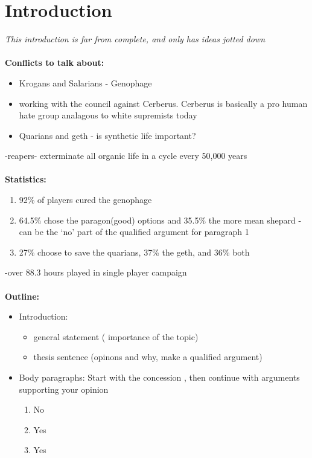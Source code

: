 \documentclass[journal]{IEEEtran}
\begin{document}
\section{Introduction}
\textit{This introduction is far from complete, and only has ideas jotted down}
\\ \\
\textbf{Conflicts to talk about:}
\begin{itemize}
 \item Krogans and Salarians - Genophage
 \item working with the council against Cerberus. Cerberus is basically a pro human hate group analagous to white supremists today
 \item Quarians and geth - is synthetic life important?
\end{itemize}
-reapers- exterminate all organic life in a cycle every 50,000 years
\\ \\
\textbf{Statistics:}
\begin{enumerate}
 \item 92\% of players cured the genophage
 \item 64.5\% chose the paragon(good) options and 35.5\% the more mean shepard - can be the `no' part of the qualified argument for paragraph 1
 \item 27\% choose to save the quarians, 37\% the geth, and 36\% both
\end{enumerate}
-over 88.3 hours played in single player campaign
\\ \\
\textbf{Outline:}
\begin{itemize}
 \item Introduction:
       \begin{itemize}
        \item general statement ( importance of the topic)
        \item thesis sentence (opinons and why, make a qualified argument)
       \end{itemize}
 \item Body paragraphs: Start with the concession , then continue with arguments supporting your opinion
       \begin{enumerate}
        \item No
        \item Yes
        \item Yes
       \end{enumerate}

\end{itemize}
\end{document}

